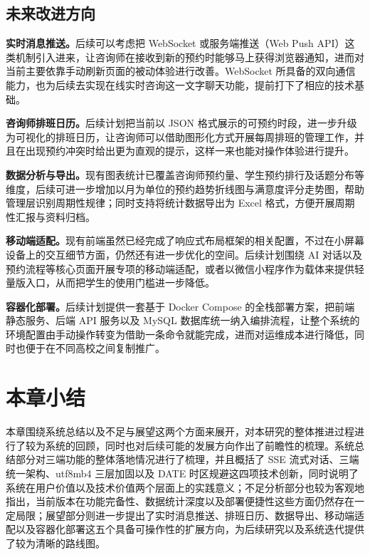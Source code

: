 \subsection{未来改进方向}

\textbf{实时消息推送。}后续可以考虑把 WebSocket 或服务端推送（Web Push API）这类机制引入进来，让咨询师在接收到新的预约时能够马上获得浏览器通知，进而对当前主要依靠手动刷新页面的被动体验进行改善。WebSocket 所具备的双向通信能力，也为后续去实现在线实时咨询这一文字聊天功能，提前打下了相应的技术基础。

\textbf{咨询师排班日历。}后续计划把当前以 JSON 格式展示的可预约时段，进一步升级为可视化的排班日历，让咨询师可以借助图形化方式开展每周排班的管理工作，并且在出现预约冲突时给出更为直观的提示，这样一来也能对操作体验进行提升。

\textbf{数据分析与导出。}现有图表统计已覆盖咨询师预约量、学生预约排行及话题分布等维度，后续可进一步增加以月为单位的预约趋势折线图与满意度评分走势图，帮助管理层识别周期性规律；同时支持将统计数据导出为 Excel 格式，方便开展周期性汇报与资料归档。

\textbf{移动端适配。}现有前端虽然已经完成了响应式布局框架的相关配置，不过在小屏幕设备上的交互细节方面，仍然还有进一步优化的空间。后续计划围绕 AI 对话以及预约流程等核心页面开展专项的移动端适配，或者以微信小程序作为载体来提供轻量版入口，从而把学生的使用门槛进一步降低。

\textbf{容器化部署。}后续计划提供一套基于 Docker Compose 的全栈部署方案，把前端静态服务、后端 API 服务以及 MySQL 数据库统一纳入编排流程，让整个系统的环境配置由手动操作转变为借助一条命令就能完成，进而对运维成本进行降低，同时也便于在不同高校之间复制推广。


\section*{本章小结}

本章围绕系统总结以及不足与展望这两个方面来展开，对本研究的整体推进过程进行了较为系统的回顾，同时也对后续可能的发展方向作出了前瞻性的梳理。系统总结部分对三端功能的整体落地情况进行了梳理，并且概括了 SSE 流式对话、三端统一架构、utf8mb4 三层加固以及 DATE 时区规避这四项技术创新，同时说明了系统在用户价值以及技术价值两个层面上的实践意义；不足分析部分也较为客观地指出，当前版本在功能完备性、数据统计深度以及部署便捷性这些方面仍然存在一定局限；展望部分则进一步提出了实时消息推送、排班日历、数据导出、移动端适配以及容器化部署这五个具备可操作性的扩展方向，为后续研究以及系统迭代提供了较为清晰的路线图。

